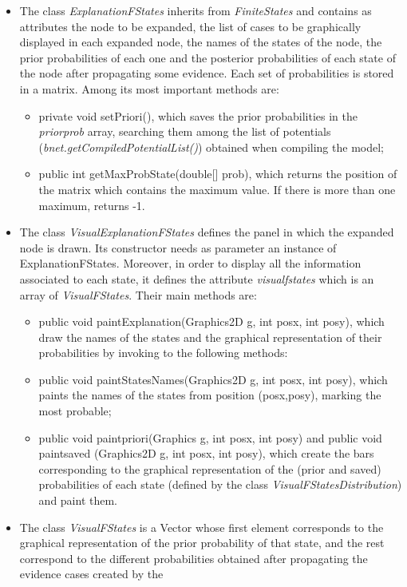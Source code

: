\begin{itemize}
  \item The class \emph{ExplanationFStates} inherits from \emph{FiniteStates} and
  contains as attributes the node to be expanded, the list of cases to be graphically
  displayed in each expanded node, the names of the states of the node, the prior probabilities
  of each one and the posterior probabilities of each state of the node after propagating some
  evidence. Each set of probabilities is stored in a matrix. Among its most important methods are:
\begin{itemize}
  \item private void setPriori(), which saves the prior probabilities in the \emph{priorprob}
  array, searching them among the list of potentials (\emph{bnet.getCompiledPotentialList()}) obtained when compiling the model;
  \item public int getMaxProbState(double[] prob), which returns
  the position of the matrix which contains the maximum value. If there is more than one maximum, returns
  -1.
\end{itemize}
  \item The class \emph{VisualExplanationFStates} defines the
  panel in which the expanded node is drawn. Its constructor needs as parameter an instance of ExplanationFStates.
  Moreover, in order to display all the information associated to each state, it defines the
  attribute \emph{visualfstates} which is an array of
  \emph{VisualFStates}. Their main methods are:
\begin{itemize}
  \item public void paintExplanation(Graphics2D g, int posx, int posy),
  which draw the names of the states and the graphical
  representation of their probabilities by invoking to the
  following methods:
  \item public void paintStatesNames(Graphics2D g, int posx, int
  posy), which paints the names of the states from position (posx,posy), marking the most
  probable;
 \item public void paintpriori(Graphics g, int posx, int posy) and public void paintsaved (Graphics2D g, int posx, int posy), which
 create the bars corresponding to the graphical representation of the (prior and saved) probabilities of each state
 (defined by the class \emph{VisualFStatesDistribution}) and paint them.
\end{itemize}
  \item The class \emph{VisualFStates} is a Vector whose first element corresponds to the graphical representation of the
  prior probability of that state, and the rest correspond to the different probabilities obtained after propagating the evidence cases created by the

\end{itemize}
